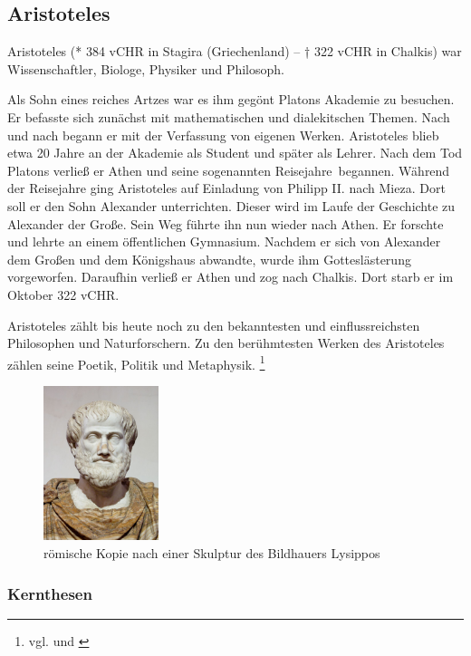 \subsection{Aristoteles}
Aristoteles (* 384 \ac{vCHR} in Stagira (Griechenland) – † 322 \ac{vCHR} in Chalkis) war Wissenschaftler, Biologe, Physiker und Philosoph. 

Als Sohn eines reiches Artzes war es ihm gegönt Platons Akademie zu besuchen. Er befasste sich zunächst mit mathematischen und dialekitschen Themen. Nach und nach begann er mit der Verfassung von eigenen Werken. Aristoteles blieb etwa 20 Jahre an der Akademie als Student und später als Lehrer. Nach dem Tod Platons verließ er Athen und seine sogenannten \glqq Reisejahre\grqq\ begannen. Während der Reisejahre ging Aristoteles auf Einladung von Philipp II. nach Mieza. Dort soll er den Sohn Alexander unterrichten. Dieser wird im Laufe der Geschichte zu Alexander der Große. Sein Weg führte ihn nun wieder nach Athen. Er forschte und lehrte an einem öffentlichen Gymnasium. Nachdem er sich von Alexander dem Großen und dem Königshaus abwandte, wurde ihm Gotteslästerung vorgeworfen. Daraufhin verließ er Athen und zog nach Chalkis. Dort starb er im Oktober 322 \ac{vCHR}. 

Aristoteles zählt bis heute noch zu den bekanntesten und einflussreichsten Philosophen und Naturforschern. Zu den berühmtesten Werken des Aristoteles zählen seine Poetik, Politik und Metaphysik.
\footnote{vgl. \cite{Aristoteles1} und \cite{Aristoteles2}}
\begin{figure}[H]
\centering 
 \includegraphics[width=0.3\textwidth]{Bilder/kap3/Aristoteles} 
 \caption{römische Kopie nach einer Skulptur des Bildhauers Lysippos \cite{WikiAR}  \label{portraitAristotles}}
\end{figure}

\subsubsection{Kernthesen}

